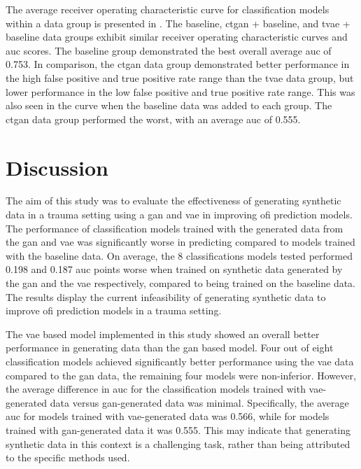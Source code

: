 \documentclass[12pt, a4paper]{article}
\begin{document}
The average receiver operating characteristic curve for classification models within a data group is presented in
. The baseline, \acrshort{ctgan} + baseline, and \acrshort{tvae} + baseline data groups exhibit similar
receiver operating characteristic curves and \acrshort{auc} scores. The baseline group demonstrated the best overall
average \acrshort{auc} of 0.753. In comparison, the \acrshort{ctgan} data group demonstrated better performance in the
high false positive and true positive rate range than the \acrshort{tvae} data group, but lower performance in the low
false positive and true positive rate range. This was also seen in the curve when the baseline data was added to each
group. The \acrshort{ctgan} data group performed the worst, with an average \acrshort{auc} of 0.555.

\section{Discussion}
The aim of this study was to evaluate the effectiveness of generating synthetic data in a trauma setting using a
\acrshort{gan} and \acrshort{vae} in improving \acrshort{ofi} prediction models. The performance of classification
models trained with the generated data from the \acrshort{gan} and \acrshort{vae} was significantly worse in predicting
 compared to models trained with the baseline data. On average, the 8 classifications models tested
performed 0.198 and 0.187 \acrshort{auc} points worse when trained on synthetic data generated by the \acrshort{gan}
and the \acrshort{vae} respectively, compared to being trained on the baseline data. The results display the current
infeasibility of generating synthetic data to improve \acrshort{ofi} prediction models in a trauma setting.

The \acrshort{vae} based model implemented in this study showed an overall better performance in generating data than
the \acrshort{gan} based model. Four out of eight classification models achieved significantly better performance using
the \acrshort{vae} data compared to the \acrshort{gan} data, the remaining four models were non-inferior. However, the
average difference in \acrshort{auc} for the classification models trained with \acrshort{vae}-generated data versus
\acrshort{gan}-generated data was minimal. Specifically, the average \acrshort{auc} for models trained with
\acrshort{vae}-generated data was 0.566, while for models trained with \acrshort{gan}-generated data it was 0.555. This
may indicate that generating synthetic data in this context is a challenging task, rather than being attributed to the
specific methods used.
\end{document}
